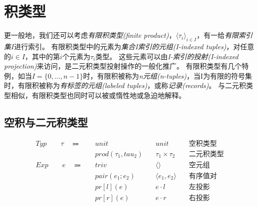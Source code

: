 \chapter{积类型}


更一般地，我们还可以考虑\textit{有限积类型(finite product)}，$\langle\tau_i \rangle_{i\in I}$，有一给\textit{有限索引集}$I$进行索引。
有限积类型中的元素为\textit{集合I索引的元组(I-indexed tuples)}，对任意的$i\in I$，其中的第$i$个元素为$\tau_i$类型。
这些元素可以由\textit{I-索引的投射(I-indexed projection)}来访问，是二元积类型投射操作的一般化推广。
有限积类型有几个特例，如当$I = \{ 0, \dots, n-1\}$时，有限积被称为\textit{n元组(n-tuples)}，当I为有限的符号集时，有限积被称为\textit{有标签的元组(labeled tuples)}，或称\textit{记录(records)}。
与二元积类型相似，有限积类型也同时可以被或惰性地或急迫地解释。


\section{空积与二元积类型}
\begin{equation*}
\begin{align}
Typ \qquad \tau \quad \Coloneqq \quad &unit\quad &unit \quad &\mbox{空积类型}
\\
&prod(\tau_1, tau_2) \quad &\tau_1 \times \tau_2 \quad &\mbox{二元积类型}
\\
Exp \qquad e \quad \Coloneqq \quad &triv \quad &\langle \rangle \quad &\mbox{空元组}
\\
&pair(e_1; e_2) \quad &\langle e_1,e_2 \rangle \quad &\mbox{有序值对}
\\
&pr[l](e) \quad &e \cdot l \quad &\mbox{左投影}
\\
&pr[r](e) \quad &e \cdot r \quad &\mbox{右投影}
\end{align}
\end{equation*}

